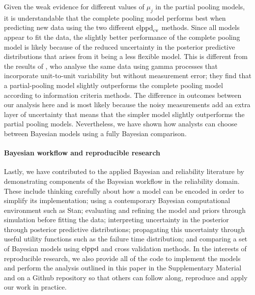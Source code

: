 \documentclass{article}
\begin{document}
Given the weak evidence for different values of $\mu_j$ in the partial pooling models, it is understandable that the complete pooling model performs best when predicting new data using the two different $\hbox{elppd}_\text{cv}$ methods. Since all models appear to fit the data, the slightly better performance of the complete pooling model is likely because of the reduced uncertainty in the posterior predictive distributions that arises from it being a less flexible model. This is different from the results of \citet{rodriguez-picon_degradation_2018}, who analyse the same data using gamma processes that incorporate unit-to-unit variability but without measurement error; they find that a partial-pooling model slightly outperforms the complete pooling model according to information criteria methods. The difference in outcomes between our analysis here and \citet{rodriguez-picon_degradation_2018} is most likely because the noisy measurements add an extra layer of uncertainty that means that the simpler model slightly outperforms the partial pooling models. Nevertheless, we have shown how analysts can choose between Bayesian models using a fully Bayesian comparison.

\paragraph*{Bayesian workflow and reproducible research} Lastly, we have contributed to the applied Bayesian and reliability literature by demonstrating components of the Bayesian workflow in the reliability domain. These include thinking carefully about how a model can be encoded in order to simplify its implementation; using a contemporary Bayesian computational environment such as Stan; evaluating and refining the model and priors through simulation before fitting the data; interpreting uncertainty in the posterior through posterior predictive distributions; propagating this uncertainty through useful utility functions such as the failure time distribution; and comparing a set of Bayesian models using $\hbox{elppd}$ and cross validation methods. In the interests of reproducible research, we also provide all of the code to implement the models and perform the analysis outlined in this paper in the Supplementary Material and on a Github repository so that others can follow along, reproduce and apply our work in practice.

\newpage



\end{document}
